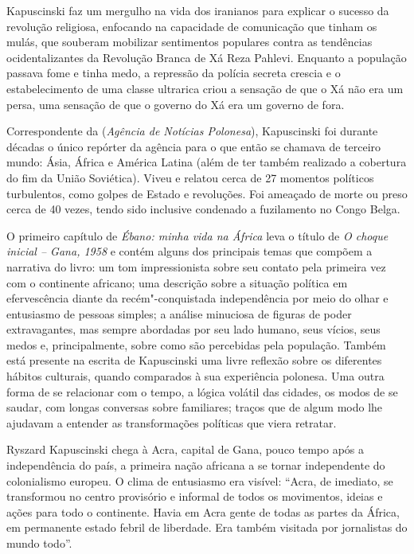 Kapuscinski faz um mergulho na vida dos iranianos para
explicar o sucesso da revolução religiosa, enfocando na capacidade de
comunicação que tinham os mulás, que souberam mobilizar sentimentos
populares contra as tendências ocidentalizantes da Revolução Branca de
Xá Reza Pahlevi. Enquanto a população passava fome e tinha medo, a
repressão da polícia secreta crescia e o estabelecimento de uma classe
ultrarica criou a sensação de que o Xá não era um persa, uma sensação
de que o governo do Xá era um governo de fora.

\asterisc

Correspondente da  (\emph{Agência de Notícias Polonesa}), Kapuscinski foi
durante décadas o único repórter da agência para o que então se chamava
de terceiro mundo: Ásia, África e América Latina (além de ter também
realizado a cobertura do fim da União Soviética). Viveu e relatou cerca
de 27 momentos políticos turbulentos, como golpes de Estado e
revoluções. Foi ameaçado de morte ou preso cerca de 40 vezes, tendo sido
inclusive condenado a fuzilamento no Congo Belga.

O primeiro capítulo de \emph{Ébano: minha vida na África} leva o título
de \emph{O choque inicial -- Gana, 1958} e contém alguns dos principais
temas que compõem a narrativa do livro: um tom impressionista sobre seu
contato pela primeira vez com o continente africano; uma descrição sobre a situação
política em efervescência diante da recém"-conquistada independência
por meio do olhar e entusiasmo de pessoas simples; a análise minuciosa de
figuras de poder extravagantes, mas sempre abordadas por seu lado
humano, seus vícios, seus medos e, principalmente, sobre como são
percebidas pela população. Também está presente na escrita de
Kapuscinski uma livre reflexão sobre os diferentes hábitos culturais,
quando comparados à sua experiência polonesa. Uma outra forma de se
relacionar com o tempo, a lógica volátil das cidades, os modos de se
saudar, com longas conversas sobre familiares; traços que
de algum modo lhe ajudavam a entender as transformações políticas que
viera retratar.

Ryszard Kapuscinski chega à Acra, capital de Gana, pouco tempo após a
independência do país, a primeira nação africana a se tornar
independente do colonialismo europeu. O clima de entusiasmo era visível:
``Acra, de imediato, se transformou no centro provisório e informal de
todos os movimentos, ideias e ações para todo o continente. Havia em
Acra gente de todas as partes da África, em permanente estado febril de
liberdade. Era também visitada por jornalistas do mundo todo''.

